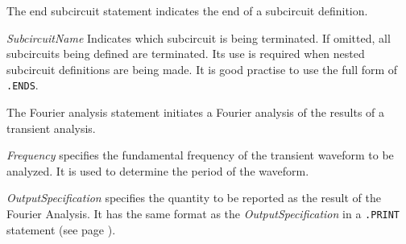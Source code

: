 

%
%

The end subcircuit statement indicates the end of a subcircuit definition.


\begin{widelist}
\item[{\it SubcircuitName}] Indicates which subcircuit is being terminated.
If  omitted, all subcircuits being defined are terminated.
Its use is required when nested subcircuit definitions are being made.
It is good practise to use the full form of {\tt .ENDS}.
\end{widelist}



%
%

The Fourier analysis statement initiates a Fourier analysis of the results of
a transient analysis.


\begin{widelist}
\item[{\it Frequency}] specifies the fundamental frequency of the transient
waveform to be analyzed.  It is used to determine the period of the waveform.

\item[{\it OutputSpecification}]  specifies the quantity to be reported
     as the result of the Fourier Analysis.  It has the same format as the
     {\it OutputSpecification} in a {\tt .PRINT} statement (see page
     \pageref{.PRINTstatement}).
\end{widelist}



